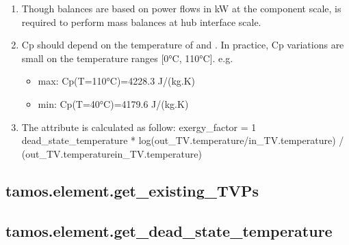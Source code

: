\documentclass[letterpaper,10pt,english]{sphinxmanual}
\begin{document}
\begin{fulllineitems}
\begin{enumerate}
\item {} 
\sphinxAtStartPar
Though balances are based on power flows in kW at the component scale,  is required to perform mass balances at hub interface scale.

\item {} 
\sphinxAtStartPar
Cp should depend on the temperature of  and . In practice, Cp variations are small on the temperature ranges {[}0°C, 110°C{]}.
e.g.
\begin{itemize}
\item {} 
\sphinxAtStartPar
max: Cp(T=110°C)=4228.3 J/(kg.K)

\item {} 
\sphinxAtStartPar
min: Cp(T=40°C)=4179.6 J/(kg.K)

\end{itemize}

\item {} 
\sphinxAtStartPar
The  attribute is calculated as follow:
exergy\_factor = 1 \sphinxhyphen{} dead\_state\_temperature * log(out\_TV.temperature/in\_TV.temperature) / (out\_TV.temperature\sphinxhyphen{}in\_TV.temperature)

\end{enumerate}

\end{fulllineitems}


\sphinxstepscope


\subsection{tamos.element.get\_existing\_TVPs}
\label{\detokenize{generated/tamos.element.get_existing_TVPs:tamos-element-get-existing-tvps}}\label{\detokenize{generated/tamos.element.get_existing_TVPs::doc}}

\begin{fulllineitems}
\label{\detokenize{generated/tamos.element.get_existing_TVPs:tamos.element.get_existing_TVPs}}
\pysigstartsignatures
{}
\pysigstopsignatures
\end{fulllineitems}


\sphinxstepscope


\subsection{tamos.element.get\_dead\_state\_temperature}
\label{\detokenize{generated/tamos.element.get_dead_state_temperature:tamos-element-get-dead-state-temperature}}\label{\detokenize{generated/tamos.element.get_dead_state_temperature::doc}}
\end{document}
